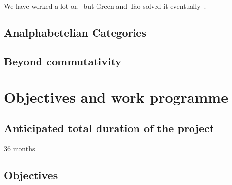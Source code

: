 \documentclass[a4paper,11pt]{amsart}
\theoremstyle{definition}
\newcommand{\<}{\langle}
\renewcommand{\>}{\rangle}
\begin{document}
We have worked a lot on~\cite{x92:_analp_formal} but Green and Tao
solved it eventually~\cite{green2008primes}.  \lipsum[1]

\subsection{Analphabetelian Categories} \label{sec:one}

\lipsum[3]

\subsection{Beyond commutativity} \label{sec:two}

\lipsum[4]


\section{Objectives and work programme} \label{sec:objAndWork}

\subsection{Anticipated total duration of the project}
36 months

\subsection{Objectives} \label{sec:objectives}
\end{document}
